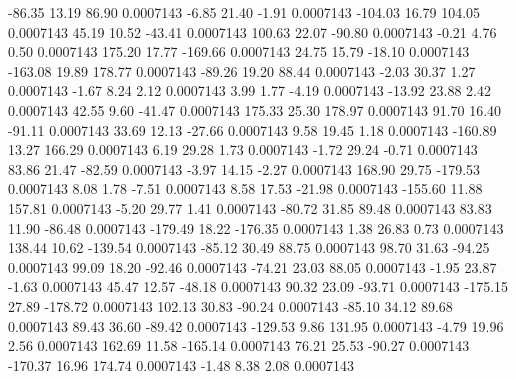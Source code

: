       -86.35       13.19       86.90     0.0007143
       -6.85       21.40       -1.91     0.0007143
     -104.03       16.79      104.05     0.0007143
       45.19       10.52      -43.41     0.0007143
      100.63       22.07      -90.80     0.0007143
       -0.21        4.76        0.50     0.0007143
      175.20       17.77     -169.66     0.0007143
       24.75       15.79      -18.10     0.0007143
     -163.08       19.89      178.77     0.0007143
      -89.26       19.20       88.44     0.0007143
       -2.03       30.37        1.27     0.0007143
       -1.67        8.24        2.12     0.0007143
        3.99        1.77       -4.19     0.0007143
      -13.92       23.88        2.42     0.0007143
       42.55        9.60      -41.47     0.0007143
      175.33       25.30      178.97     0.0007143
       91.70       16.40      -91.11     0.0007143
       33.69       12.13      -27.66     0.0007143
        9.58       19.45        1.18     0.0007143
     -160.89       13.27      166.29     0.0007143
        6.19       29.28        1.73     0.0007143
       -1.72       29.24       -0.71     0.0007143
       83.86       21.47      -82.59     0.0007143
       -3.97       14.15       -2.27     0.0007143
      168.90       29.75     -179.53     0.0007143
        8.08        1.78       -7.51     0.0007143
        8.58       17.53      -21.98     0.0007143
     -155.60       11.88      157.81     0.0007143
       -5.20       29.77        1.41     0.0007143
      -80.72       31.85       89.48     0.0007143
       83.83       11.90      -86.48     0.0007143
     -179.49       18.22     -176.35     0.0007143
        1.38       26.83        0.73     0.0007143
      138.44       10.62     -139.54     0.0007143
      -85.12       30.49       88.75     0.0007143
       98.70       31.63      -94.25     0.0007143
       99.09       18.20      -92.46     0.0007143
      -74.21       23.03       88.05     0.0007143
       -1.95       23.87       -1.63     0.0007143
       45.47       12.57      -48.18     0.0007143
       90.32       23.09      -93.71     0.0007143
     -175.15       27.89     -178.72     0.0007143
      102.13       30.83      -90.24     0.0007143
      -85.10       34.12       89.68     0.0007143
       89.43       36.60      -89.42     0.0007143
     -129.53        9.86      131.95     0.0007143
       -4.79       19.96        2.56     0.0007143
      162.69       11.58     -165.14     0.0007143
       76.21       25.53      -90.27     0.0007143
     -170.37       16.96      174.74     0.0007143
       -1.48        8.38        2.08     0.0007143
